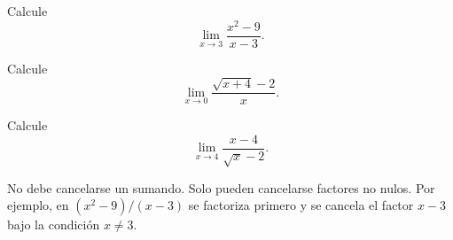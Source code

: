 \documentclass[10pt,a5paper]{article}
\newif\ifmostrarSoluciones
\begin{document}
\begin{ejemplo}[factorización]
Calcule
\[
\lim_{x\to3}\frac{x^2-9}{x-3}.
\]
\end{ejemplo}
\ifmostrarSoluciones
\begin{solucion}
La sustitución produce $0/0$. Para $x\neq3$,
\[
\frac{x^2-9}{x-3}=\frac{(x-3)(x+3)}{x-3}=x+3.
\]
Las funciones son localmente iguales alrededor de $3$; por tanto, el límite es $6$.
\end{solucion}
\else\vspace{16mm}\fi

\begin{ejemplo}
Calcule
\[
\lim_{x\to0}\frac{\sqrt{x+4}-2}{x}.
\]
\end{ejemplo}
\ifmostrarSoluciones
\begin{solucion}
Se multiplica por el conjugado:
\begin{align*}
\frac{\sqrt{x+4}-2}{x}
&=\frac{(\sqrt{x+4}-2)(\sqrt{x+4}+2)}{x(\sqrt{x+4}+2)}\\
&=\frac{1}{\sqrt{x+4}+2},\qquad x\neq0.
\end{align*}
En consecuencia, el límite es $1/4$.
\end{solucion}
\else\vspace{18mm}\fi

\begin{ejemplo}
Calcule
\[
\lim_{x\to4}\frac{x-4}{\sqrt{x}-2}.
\]
\end{ejemplo}
\ifmostrarSoluciones
\begin{solucion}
Para $x\neq4$,
\[
\frac{x-4}{\sqrt{x}-2}
=\frac{(\sqrt{x}-2)(\sqrt{x}+2)}{\sqrt{x}-2}
=\sqrt{x}+2.
\]
Luego el límite es $4$.
\end{solucion}
\else\vspace{15mm}\fi

\begin{nota}
No debe cancelarse un sumando. Solo pueden cancelarse factores no nulos. Por ejemplo, en $(x^2-9)/(x-3)$ se factoriza primero y se cancela el factor $x-3$ bajo la condición $x\neq3$.
\end{nota}
\end{document}
